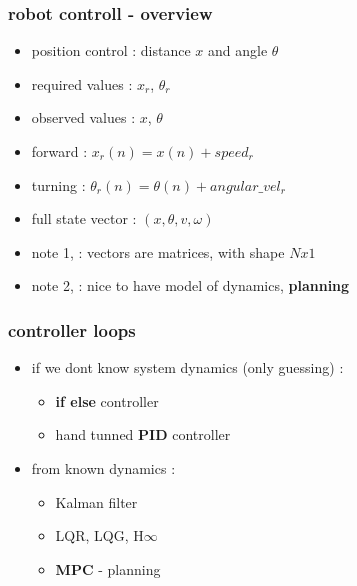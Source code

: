 \documentclass{beamer}
\begin{document}
\begin{frame}
  \frametitle{\bf robot controll - overview}

  \begin{itemize}
    \item position control : distance $x$ and angle $\theta$
    \item required values : $x_r$, $\theta_r$
    \item observed values : $x$, $\theta$ 
    \item forward  : $x_r(n) = x(n) + speed_{r}$
    \item turning  : $\theta_r(n) = \theta(n) + angular\_vel_{r}$
    \item full state vector : $(x, \theta, v, \omega)$
    \item note 1, : vectors are matrices, with shape $N x 1$
    \item note 2, : nice to have model of dynamics, \bf{planning}
  \end{itemize}

\end{frame}



\begin{frame}
  \frametitle{\bf controller loops}


  \begin{itemize}
    \item if we dont know system dynamics (only guessing) : 
      \begin{itemize}
        \item {\bf{if else}} controller
        \item hand tunned {\bf{PID}} controller
      \end{itemize}
    \item from known dynamics :
      \begin{itemize}
        \item Kalman filter
        \item LQR, LQG, H$\infty$
        \item {\bf{MPC}} - planning
      \end{itemize}
  \end{itemize}

\end{frame}
\end{document}
